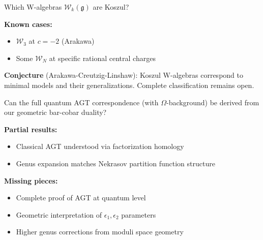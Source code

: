 \begin{question}\label{q:koszul-w}
Which W-algebras $\mathcal{W}_k(\mathfrak{g})$ are Koszul?

\textbf{Known cases:}
\begin{itemize}
\item $\mathcal{W}_3$ at $c = -2$ (Arakawa)
\item Some $\mathcal{W}_N$ at specific rational central charges
\end{itemize}

\textbf{Conjecture} (Arakawa-Creutzig-Linshaw): Koszul W-algebras correspond to 
minimal models and their generalizations. Complete classification remains open.
\end{question}

\begin{question}\label{q:quantum-agt}
Can the full quantum AGT correspondence (with $\Omega$-background) be derived from 
our geometric bar-cobar duality?

\textbf{Partial results:}
\begin{itemize}
\item Classical AGT understood via factorization homology
\item Genus expansion matches Nekrasov partition function structure
\end{itemize}

\textbf{Missing pieces:}
\begin{itemize}
\item Complete proof of AGT at quantum level
\item Geometric interpretation of $\epsilon_1, \epsilon_2$ parameters
\item Higher genus corrections from moduli space geometry
\end{itemize}
\end{question}


